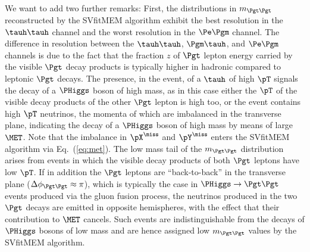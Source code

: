 {{{{{We want to add two further remarks:
First, the distributions in $m_{\Pgt\Pgt}$ reconstructed by the SVfitMEM algorithm 
exhibit the best resolution in the $\tauh\tauh$ channel and the worst resolution in the $\Pe\Pgm$ channel.
The difference in resolution between the $\tauh\tauh$, $\Pgm\tauh$, and $\Pe\Pgm$ channels
is due to the fact that the fraction $z$ of $\Pgt$ lepton energy carried by the visible $\Pgt$ decay
products is typically higher in hadronic compared to leptonic $\Pgt$ decays.
The presence, in the event, of a $\tauh$ of high $\pT$ signals the decay of a
$\PHiggs$ boson of high mass,
as in this case either the $\pT$ of the visible decay products of the
other $\Pgt$ lepton is high too,
or the event contains high $\pT$ neutrinos, the momenta of which are imbalanced in the transverse plane,
indicating the decay of a $\PHiggs$ boson of high mass  by means of large $\MET$.
Note that the imbalance in $\pX^{\miss}$ and $\pY^{\miss}$ enters the SVfitMEM algorithm via Eq.~(\ref{eq:met}).
The low mass tail of the $m_{\Pgt\Pgt}$ distribution arises from events in which the visible decay products of both $\Pgt$ leptons have low $\pT$.
If in addition the $\Pgt$ leptons are ``back-to-back'' in the transverse plane ($\Delta\phi_{\Pgt\Pgt} \approx \pi$),
which is typically the case in $\PHiggs \to \Pgt\Pgt$ events produced via the gluon fusion process,
the neutrinos produced in the two $\Pgt$ decays are emitted in opposite hemispheres, 
with the effect that their contribution to $\MET$ cancels.
Such events are indistinguishable from the decays of $\PHiggs$ bosons of low mass
and are hence assigned low $m_{\Pgt\Pgt}$ values by the SVfitMEM algorithm.

}}}}}
